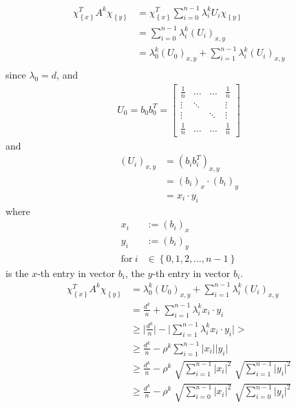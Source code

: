 \documentclass[12pt]{article}%
\begin{document}
   \begin{align}
        \chi^T_{\left\{ x \right\}} A^k \chi_{\left\{ y \right\}} &= 
       \chi^T_{\left\{ x \right\}} \sum_{i=0}^{n-1} \lambda_i^k U_i \chi_{\left\{ y \right\}} \\
       &= \sum_{i=0}^{n-1} \lambda_i^k (U_i)_{x,y} \\
       &= \lambda_0^k (U_0)_{x,y} + \sum_{i=1}^{n-1} \lambda_i^k (U_i)_{x,y} \\
   \end{align}
    since $\lambda_0 = d$, and 
    \begin{align}
       U_0 = b_0 b_0^T =
     \begin{bmatrix}
         \frac{ 1 }{ n } & \ldots & \ldots & \frac{ 1 }{ n }\\
          \vdots & \ddots & & \vdots \\
          \vdots & & \ddots & \vdots \\
          \frac{ 1 }{ n } & \ldots & \ldots & \frac{ 1 }{ n }
      \end{bmatrix}
  \end{align}
  and 
    \begin{align}
        (U_i)_{x,y} &= (b_i b_i^T)_{x,y}\\
        &= (b_i)_x \cdot (b_i)_y\\
        &= x_i \cdot y_i
    \end{align}
    where 
    \begin{align}
        x_i &:= (b_i)_x\\
        y_i &:= (b_i)_y\\
        \text{for} \ i &\in \left\{ 0,1,2, \ldots, n-1 \right\}
    \end{align}
    is the $x$-th entry in vector $b_i$, the 
    $y$-th entry in vector $b_i$.
   \begin{align}
\chi^T_{\left\{ x \right\}} A^k \chi_{\left\{ y \right\}} &= 
\lambda_0^k (U_0)_{x,y} + \sum_{i=1}^{n-1} \lambda_i^k (U_i)_{x,y} \\
&= \frac{ d^k }{ n } + \sum_{i=1}^{n-1} \lambda_i^k x_i \cdot y_i\\
&\geq \lvert \frac{ d^k }{ n }\rvert - 
\lvert \sum_{i=1}^{n-1} \lambda_i^k x_i \cdot y_i \rvert >\\
&\geq \frac{ d^k }{ n } - \rho^k \sum_{i=1}^{n-1} \lvert x_i \rvert \lvert y_i \rvert\\
&\geq \frac{ d^k }{ n } -
\rho^k \sqrt[]{\sum_{i=1}^{n-1} \lvert x_i\rvert^2 } \sqrt[]{\sum_{i=1}^{n-1} \lvert y_i \rvert^2}\\
&\geq \frac{ d^k }{ n } -
\rho^k \sqrt[]{\sum_{i=0}^{n-1} \lvert x_i\rvert^2 } \sqrt[]{\sum_{i=0}^{n-1} \lvert y_i \rvert^2}\\
   \end{align}
\end{document}

